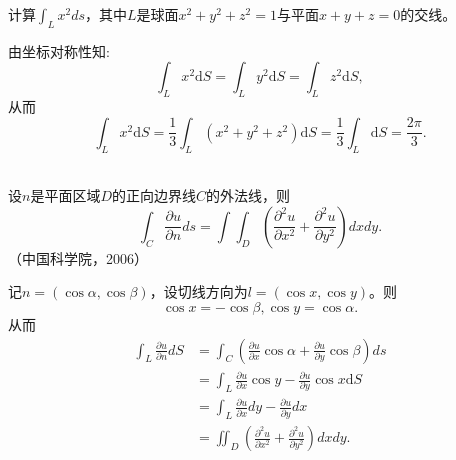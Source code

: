 \begin{exercise}
计算$\int_Lx^2ds$，其中$L$是球面$x^2+y^2+z^2=1$与平面$x+y+z=0$的交线。%
   
  
   由坐标对称性知:
  $$\int_Lx^2\mathrm{d}S=\int_Ly^2\mathrm{d}S=\int_Lz^2\mathrm{d}S,$$
  从而$$\int_Lx^2\mathrm{d}S=\frac{1}{3}\int_L(x^2+y^2+z^2)\mathrm{d}S=\frac{1}{3}\int_L\mathrm{d}S=\frac{2\pi}{3}.$$
 
  \end{exercise}
  \begin{exercise}
  \hfill\\
   设$n$是平面区域$D$的正向边界线$C$的外法线，则$$\int_C\frac{\partial u}{\partial n}ds=\int\int_D(\frac{\partial^2u}{\partial x^2}+\frac{\partial^2u}{\partial y^2})dxdy.$$（中国科学院，2006） 
  
记$n=(\cos\alpha,\cos\beta)$，设切线方向为$l=(\cos x,\cos y)$。则
$$\cos x=-\cos\beta,\cos y=\cos\alpha.$$
从而
\begin{align*}
\int_L\frac{\partial u}{\partial n}dS&=\int_C(\frac{\partial u}{\partial x}\cos\alpha+\frac{\partial u}{\partial y}\cos\beta)ds\\
&=\int_L\frac{\partial u}{\partial x}\cos y-\frac{\partial u}{\partial y}\cos x\mathrm{d}S\\
&=\int_L\frac{\partial u}{\partial x}dy-\frac{\partial u}{\partial y}dx\\
&=\iint_D(\frac{\partial^2u}{\partial x^2}+\frac{\partial^2u}{\partial y^2})dxdy.\\
\end{align*}  
  \end{exercise}

